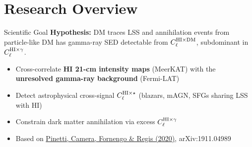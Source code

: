 \section{Research Overview}

\begin{frame}{Scientific Goal}
\textbf{Hypothesis:} DM traces LSS and annihilation events from particle-like DM has gamma-ray SED detectable from $C_\ell^{\mathrm{HI}\times\mathrm{DM}}$, subdominant in $C_\ell^{\mathrm{HI}\times\gamma}$.
\begin{itemize}
    \item Cross-correlate \textbf{HI 21-cm intensity maps} (MeerKAT) with the \textbf{unresolved gamma-ray background} (Fermi-LAT)
    \item Detect astrophysical cross-signal $C_\ell^{\mathrm{HI}\times\star}$ (blazars, mAGN, SFGs sharing LSS with HI)
    \item Constrain dark matter annihilation via excess $C_\ell^{\mathrm{HI}\times\gamma}$
    \item Based on \href{https://arxiv.org/abs/1911.04989}{Pinetti, Camera, Fornengo \& Regis (2020)}, arXiv:1911.04989
\end{itemize}
\end{frame}

